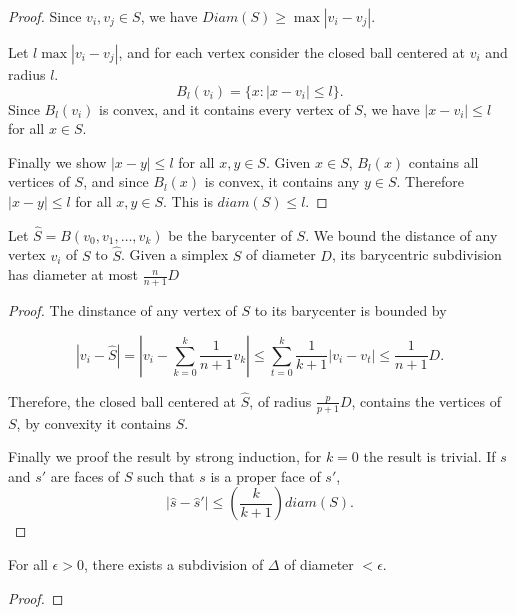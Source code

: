 \begin{proof}
 
  Since $v_i, v_j \in S$,  we have $Diam(S) \geq \max |v_i - v_j|$.

  Let $l\max |v_i - v_j|$, and for each vertex consider 
  the closed ball centered at $v_i$ and radius $l$.
  \[
    B_l(v_i) = \{x : |x-v_i|\leq l\}.
  \]
  Since $B_l(v_i)$ is convex, and it contains every vertex of $S$, we have
  $|x-v_i|\leq l$ for all $x\in S$.

  Finally we show $|x-y|\leq l$ for all $x, y\in S$.
  Given $x\in S$, $B_l(x)$ contains all vertices of $S$, 
  and since $B_l(x)$ is convex, it contains any $y\in S$.
  Therefore $|x-y|\leq l$ for all $x, y\in S$.
  This is $diam(S)\leq l$.
  
\end{proof}

\begin{lemma} Let $\hat S = B(v_0,v_1,\dots, v_k)$ be the barycenter of $S$. We bound the distance of any vertex $v_i$ of $S$ to $\hat S$.
  \label{diameter_barycentric_subdivision}
  Given a simplex $S$ of diameter $D$, its barycentric subdivision has diameter at most $\frac{n}{n+1}D$
\end{lemma}

\begin{proof}
  The dinstance of any vertex of $S$ to its barycenter is bounded by

  \[
  |v_i - \hat S | = | v_i - \sum_{k=0}^k \frac{1}{n+1}v_k| \leq \sum_{t=0}^k \frac{1}{k+1}|v_i - v_t| \leq \frac{1}{n+1} D.
  \]

  Therefore, the closed ball centered at $\hat S$, of radius $\frac{p}{p+1}D$, contains the vertices of $S$, by convexity it contains $S$.

  Finally we proof the result by strong induction, for $k=0$ the result is trivial.
  If $s$ and $s'$ are faces of $S$ such that $s$ is a proper face of $s'$, 
  \[
    |\hat s -\hat s'| \leq (\frac{k}{k+1})diam(S).
  \]
  

\end{proof}


\begin{lemma}
\label{exists_small_subdivision_of_simplex}
For all $\epsilon>0$, there exists a subdivision of $\Delta$ of diameter $<\epsilon$.
\end{lemma}
\begin{proof}

\end{proof}




